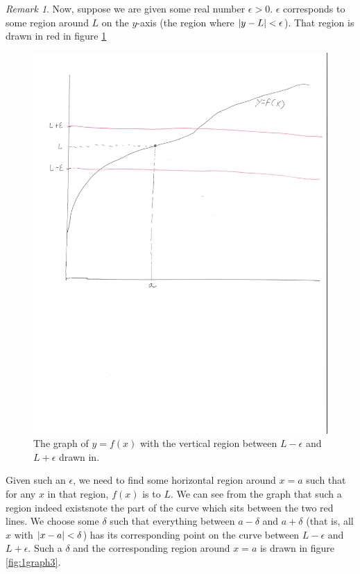 \documentclass[english]{article}
\DeclarePairedDelimiter\abs{\lvert}{\rvert}%
\theoremstyle{remark}
\newtheorem{remark}{Remark}[theorem]
\theoremstyle{definition}
\begin{document}
\begin{remark}
Now, suppose we are given some real number $\epsilon>0$. $\epsilon$ corresponds to some region around $L$ on the $y$-axis (the region where $\abs{y-L}<\epsilon$). That region is drawn in red in figure \ref{fig:1graph2}

\begin{figure}[h!]\centering
	\includegraphics[scale=0.5,trim={0 4in 10mm 0},clip]{1graph2} \caption{The graph of $y=f(x)$ with the vertical region between $L-\epsilon$ and $L+\epsilon$ drawn in.\label{fig:1graph2}}
\end{figure}

\newpage Given such an $\epsilon$, we need to find some horizontal region around $x=a$ such that for any $x$ in that region, $f(x)$ is  to $L$. We can see from the graph that such a region indeed exists\textemdash note the part of the curve which sits between the two red lines. We choose some $\delta$ such that everything between $a-\delta$ and $a+\delta$ (that is, all $x$ with $\abs{x-a}<\delta$) has its corresponding point on the curve between $L-\epsilon$ and $L+\epsilon$. Such a $\delta$ and the corresponding region around $x=a$ is drawn in figure \ref{fig:1graph3}.


\end{remark}
\end{document}
